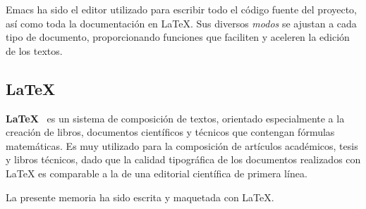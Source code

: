 Emacs ha sido el editor utilizado para escribir todo el código fuente del
proyecto, así como toda la documentación en \LaTeX. Sus diversos \textit{modos}
se ajustan a cada tipo de documento, proporcionando funciones que faciliten y
aceleren la edición de los textos.

\subsection{\LaTeX}
\textbf{\LaTeX}~\cite{latex} es un sistema de composición de textos, orientado especialmente
a la creación de libros, documentos científicos y técnicos que contengan
fórmulas matemáticas. Es muy utilizado para la composición de artículos
académicos, tesis y libros técnicos, dado que la calidad tipográfica de los
documentos realizados con LaTeX es comparable a la de una editorial científica
de primera línea.

La presente memoria ha sido escrita y maquetada con \LaTeX.

